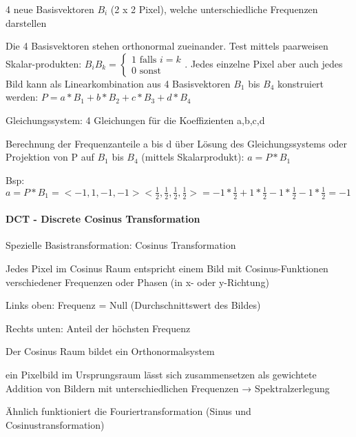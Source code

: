 \documentclass[landscape]{article}
\begin{document}
\begin{multicols}{3}
  
  4 neue Basisvektoren $B_i$ (2 x 2 Pixel), welche unterschiedliche Frequenzen darstellen
  
  
  Die 4 Basisvektoren stehen orthonormal zueinander. Test mittels paarweisen Skalar-produkten: $B_iB_k=\begin{cases}1 \text{ falls } i=k\\ 0 \text{ sonst }\end{cases}$.
  Jedes einzelne Pixel aber auch jedes Bild kann als Linearkombination aus 4 Basisvektoren $B_1$ bis $B_4$ konstruiert werden: $P=a*B_1+b*B_2+c*B_3+d*B_4$
  \begin{itemize*}
    \item Gleichungssystem: 4 Gleichungen für die Koeffizienten a,b,c,d
    \item Berechnung der Frequenzanteile a bis d über Lösung des Gleichungssystems oder Projektion von P auf $B_1$ bis $B_4$ (mittels Skalarprodukt): $a=P*B_1$
  \end{itemize*}
  
  Bsp: $a=P*B_1 = <-1, 1, -1, -1><\frac{1}{2}, \frac{1}{2}, \frac{1}{2}, \frac{1}{2}> = -1*\frac{1}{2}+1*\frac{1}{2}-1*\frac{1}{2}-1*\frac{1}{2} = -1$
  
  
  \paragraph{DCT - Discrete Cosinus Transformation}
  \begin{itemize*}
    \item Spezielle Basistransformation: Cosinus Transformation
    \item Jedes Pixel im Cosinus Raum entspricht einem Bild mit Cosinus-Funktionen verschiedener Frequenzen oder Phasen (in x- oder y-Richtung)
    \begin{itemize*}
      \item Links oben: Frequenz = Null (Durchschnittswert des Bildes)
      \item Rechts unten: Anteil der höchsten Frequenz
    \end{itemize*}
    \item Der Cosinus Raum bildet ein Orthonormalsystem
    \item ein Pixelbild im Ursprungsraum lässt sich zusammensetzen als gewichtete Addition von Bildern mit unterschiedlichen Frequenzen → Spektralzerlegung
    \item Ähnlich funktioniert die Fouriertransformation (Sinus und Cosinustransformation)
  \end{itemize*}
  

\end{multicols}
\end{document}
